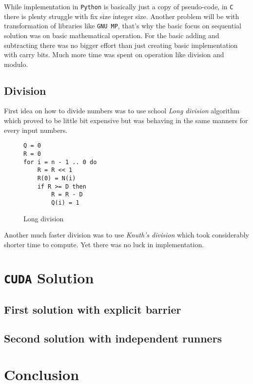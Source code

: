 \documentclass[a4paper]{article}
\begin{document}
While implementation in \texttt{Python} is basically just a copy of pseudo-code, in \texttt{C} there is plenty struggle with fix size integer size. Another problem will be with transformation of libraries like \texttt{GNU MP}, that's why the basic focus on sequential solution was on basic mathematical operation. For the basic adding and subtracting there was no bigger effort than just creating basic implementation with carry bits. Much more time was spent on operation like division and modulo.

\subsection{Division}

First idea on how to divide numbers was to use school \emph{Long division} algorithm which proved to be little bit expensive but was behaving in the same manners for every input numbers.

\begin{figure}[H]
	\centering
	\begin{lstlisting}
Q = 0
R = 0                     
for i = n - 1 .. 0 do
    R = R << 1
    R(0) = N(i)
    if R >= D then
        R = R - D
        Q(i) = 1
	\end{lstlisting}
	\caption{Long division \cite{long_div}}
	\label{long_div}
\end{figure}

Another much faster division was to use \emph{Knuth's division} \cite{knuth} which took considerably shorter time to compute. Yet there was no luck in implementation.   


\section{\texttt{CUDA} Solution}


\subsection{First solution with explicit barrier}


\subsection{Second solution with independent runners}


\section{Conclusion}





\appendix
\end{document}
